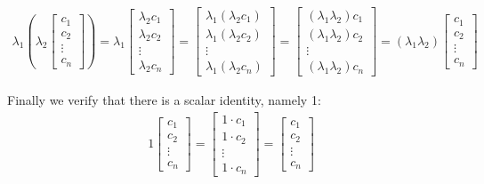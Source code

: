 \documentclass{article}
\begin{document}
\begin{align*}
    \lambda_1\left(\lambda_2\begin{bmatrix}
        c_1 \\
        c_2\\
        \vdots\\
        c_n
    \end{bmatrix}\right)=
    \lambda_1\begin{bmatrix}
        \lambda_2c_1 \\
        \lambda_2c_2\\
        \vdots\\
        \lambda_2c_n
    \end{bmatrix}=
    \begin{bmatrix}
        \lambda_1(\lambda_2c_1) \\
        \lambda_1(\lambda_2c_2)\\
        \vdots\\
        \lambda_1(\lambda_2c_n)
    \end{bmatrix}=
    \begin{bmatrix}
        (\lambda_1\lambda_2)c_1 \\
        (\lambda_1\lambda_2)c_2\\
        \vdots\\
        (\lambda_1\lambda_2)c_n
    \end{bmatrix}=
    (\lambda_1\lambda_2)\begin{bmatrix}
        c_1 \\
        c_2\\
        \vdots\\
        c_n
    \end{bmatrix}\tag{VS9}
\end{align*}

Finally we verify that there is a scalar identity, namely 1:
\begin{align*}    
1\begin{bmatrix}
    c_1 \\
    c_2\\
    \vdots\\
    c_n
\end{bmatrix}=\begin{bmatrix}
    1\cdot c_1 \\
    1\cdot c_2\\
    \vdots\\
    1\cdot c_n
\end{bmatrix}=\begin{bmatrix}
    c_1 \\
    c_2\\
    \vdots\\
    c_n
\end{bmatrix}\tag{VS10}
\end{align*}
\end{document}
